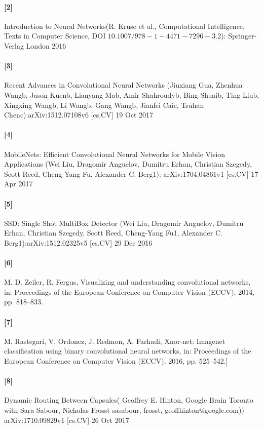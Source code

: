 \documentclass[12pt]{article}
\begin{document}
{{\paragraph*{[2]}
Introduction to Neural Networks(R. Kruse et al., Computational Intelligence, Texts in Computer Science, DOI $10.1007/978-1-4471-7296-$3.2): Springer-Verlag London 2016
\paragraph*{[3]}
Recent Advances in Convolutional Neural Networks (Jiuxiang Gua, Zhenhua Wangb, Jason Kuenb, Lianyang Mab, Amir Shahroudyb, Bing Shuaib, Ting
Liub, Xingxing Wangb, Li Wangb, Gang Wangb, Jianfei Caic, Tsuhan Chenc):arXiv:1512.07108v6 [cs.CV] 19 Oct 2017
\paragraph*{[4]}
MobileNets: Efficient Convolutional Neural Networks for Mobile Vision Applications (Wei Liu, Dragomir Anguelov, Dumitru Erhan, Christian Szegedy, Scott Reed, Cheng-Yang Fu, Alexander C. Berg1): arXiv:1704.04861v1 [cs.CV] 17 Apr 2017
\paragraph*{[5]}
SSD: Single Shot MultiBox Detector (Wei Liu, Dragomir Anguelov, Dumitru Erhan, Christian Szegedy, Scott Reed, Cheng-Yang Fu1, Alexander C. Berg1):arXiv:1512.02325v5 [cs.CV] 29 Dec 2016
\paragraph*{[6]}
M. D. Zeiler, R. Fergus, Visualizing and understanding convolutional networks, in: Proceedings of the European Conference on Computer Vision (ECCV), 2014, pp. 818–833.
\paragraph*{[7]}
M. Rastegari, V. Ordonez, J. Redmon, A. Farhadi, Xnor-net: Imagenet classification using binary convolutional neural networks, in: Proceedings of the European Conference on Computer Vision (ECCV), 2016, pp. 525–542.]
\paragraph*{[8]}
Dynamic Routing Between Capsules( Geoffrey E. Hinton, Google Brain Toronto with Sara Sabour, Nicholas Frosst {sasabour, frosst, geoffhinton}@google.com)) arXiv:1710.09829v1 [cs.CV] 26 Oct 2017
}}
\end{document}
